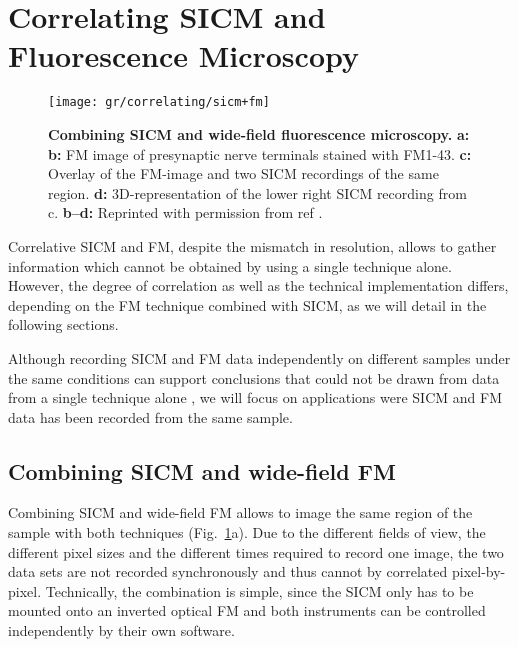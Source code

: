\section{Correlating SICM and Fluorescence Microscopy}
\label{sec:correlating-sicm-and-fm}

\begin{figure}
  \texttt{[image: gr/correlating/sicm+fm]}
  \caption{%
    \textbf{Combining SICM and wide-field fluorescence microscopy.}
    \textbf{a:}
    \textbf{b:} FM image of presynaptic nerve terminals stained with
    FM1-43. \textbf{c:} Overlay of the FM-image and two SICM recordings of the
    same region. \textbf{d:} 3D-representation of the lower right SICM
    recording from c.
    \textbf{b--d:} Reprinted with permission from ref \cite{Scheenen2015}.
  }
  \label{fig:sicm+fm}
\end{figure}

Correlative SICM and FM, despite the mismatch in resolution, allows to gather
information which cannot be obtained by using a single technique
alone. However, the degree of correlation as well as the technical
implementation differs, depending on the FM technique combined with SICM, as
we will detail in the following sections.

Although recording SICM and FM data independently on different samples under
the same conditions can support conclusions that could not be drawn from data
from a single technique alone \cite{Gesper2017,Lee2013,Lyon2009}, we will
focus on applications were SICM and FM data has been recorded from the same
sample.


\subsection{Combining SICM and wide-field FM}
\label{sec:SICM+widefield}
Combining SICM and wide-field FM allows to image the same region of the sample
with both techniques (Fig.~\ref{fig:sicm+fm}a). Due to the different fields of
view, the different pixel sizes and the different times required to record one
image, the two data sets are not recorded synchronously and thus cannot by
correlated pixel-by-pixel.  Technically, the combination is simple, since
the SICM only has to be mounted onto an inverted optical FM and both
instruments can be controlled independently by their own software.

